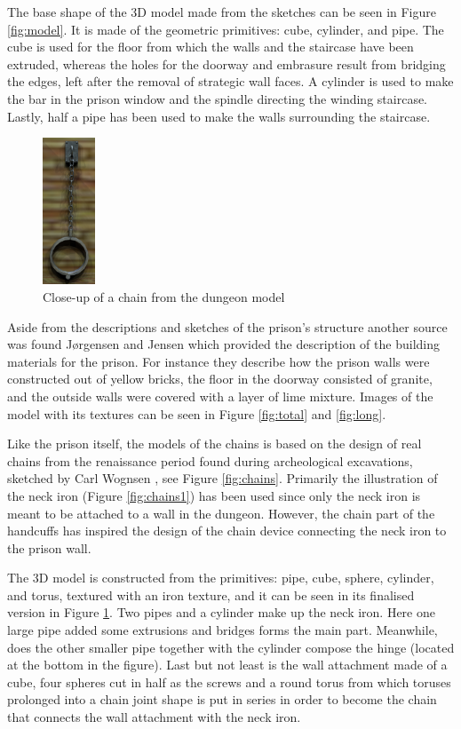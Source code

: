The base shape of the 3D model made from the sketches can be seen in Figure \ref{fig:model}. It is made of the geometric primitives: cube, cylinder, and pipe. The cube is used for the floor from which the walls and the staircase have been extruded, whereas the holes for the doorway and embrasure result from bridging the edges, left after the removal of strategic wall faces. A cylinder is used to make the bar in the prison window and the spindle directing the winding staircase. Lastly, half a pipe has been used to make the walls surrounding the staircase.

\begin{figure}
   \centering
   \includegraphics[width=0.14\textwidth]{figures/chainmodel.png}
   \caption{Close-up of a chain from the dungeon model}\label{fig:chain_model}
\end{figure}

Aside from the descriptions and sketches of the prison’s structure another source was found Jørgensen \cite{Jorgensen1934} and Jensen \cite{Jensen1909} which provided the description of the building materials for the prison. For instance they describe how the prison walls were constructed out of yellow bricks, the floor in the doorway consisted of granite, and the outside walls were covered with a layer of lime mixture. Images of the model with its textures can be seen in Figure \ref{fig:total} and \ref{fig:long}.

Like the prison itself, the models of the chains is based on the design of real chains from the renaissance period found during archeological excavations, sketched by Carl Wognsen \cite{Riismoller1961}, see Figure \ref{fig:chains}. Primarily the illustration of the neck iron (Figure \ref{fig:chains1}) has been used since only the neck iron is meant to be attached to a wall in the dungeon. However, the chain part of the handcuffs has inspired the design of the chain device connecting the neck iron to the prison wall.

The 3D model is constructed from the primitives: pipe, cube, sphere, cylinder, and torus, textured with an iron texture, and it can be seen in its finalised version in  Figure \ref{fig:chain_model}. 
Two pipes and a cylinder make up the neck iron. Here one large pipe added some extrusions and bridges forms the main part. Meanwhile, does the other smaller pipe together with the cylinder compose the hinge (located at the bottom in the figure). Last but not least is the wall attachment made of a cube, four spheres cut in half as the screws and a round torus from which toruses prolonged into a chain joint shape is put in series in order to become the chain that connects the wall attachment with the neck iron.

